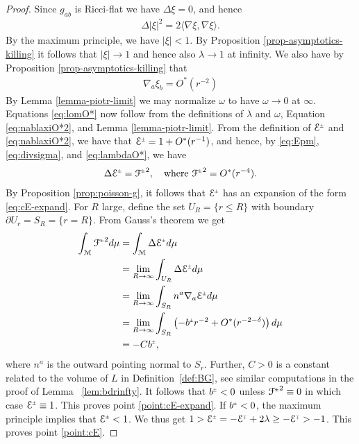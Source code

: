 \documentclass[a4paper,10pt,reqno]{amsart}
\newcommand{\la}{\langle}
\newcommand{\ra}{\rangle}
\newcommand{\cE}{\mathcal{E}}
\newcommand{\cM}{\mathcal{M}}
\theoremstyle{plain}
\newcommand{\PM}[1]{{{#1}^{\hspace{-.5pt}\scaleto{\pm}{3.5pt}}}}
\newcommand{\MP}[1]{{{#1}^{\hspace{-.5pt}\scaleto{\mp}{3.5pt}}}}
\def\Fcal{\mathcal{F}}
\numberwithin{equation}{section}
\begin{document}
\begin{proof} 

Since  $g_{ab}$ is Ricci-flat we have $\Delta \xi = 0$, and hence
\begin{align} 
\Delta |\xi|^2 = 2 \la \nabla\xi, \nabla\xi\ra . 
\end{align} 
By the maximum principle, we have $|\xi| < 1$. By Proposition \ref{prop-asymptotics-killing} it follows that $|\xi| \to 1$ and hence also $\lambda \to 1$ at infinity. 
We also have by Proposition \ref{prop-asymptotics-killing} that \begin{align} \label{eq:nablaxiO*2}
\nabla_a \xi_b = O^*(r^{-2})
\end{align} 
By Lemma \ref{lemma-piotr-limit} we may normalize $\omega$ to have $\omega \rightarrow 0$ at $\infty$. 
Equations \eqref{eq:lomO*} now follow from the definitions of $\lambda$ and $\omega$, Equation \eqref{eq:nablaxiO*2}, and Lemma \ref{lemma-piotr-limit}. 
From the definition of $\PM{\cE}$ and \eqref{eq:nablaxiO*2}, we have that $\PM{\cE} = 1 + O^*(r^{-1})$, and hence, by \eqref{eq:Epm}, \eqref{eq:divsigma}, and \eqref{eq:lambdaO*}, we have 
\begin{align} \label{eq:Duf}
\Delta \PM{\cE} = \PM{\Fcal}^2, \quad \text{where $\PM{\Fcal}^2 = O^*(r^{-4})$.}
\end{align}
By Proposition \ref{prop:poisson-g}, it follows that $\PM{\cE}$ has an expansion of the form \eqref{eq:cE-expand}. For $R$ large, define the set $U_R = \{r \leq R \}$ with boundary 
$\partial U_r = S_R = \{r = R \}$. From Gauss's theorem we get 
\begin{align}
\int_{\cM} \PM{\Fcal}^2 d\mu 
&= \int_{\cM} \Delta \PM{\cE} d\mu \nonumber \\
&= \lim_{R \to \infty} \int_{U_R} \Delta \PM{\cE} d\mu \nonumber \\
&= \lim_{R \to \infty} \int_{S_R} n^a \nabla_{a} \PM{\cE} d\mu \nonumber \\
&= \lim_{R \to \infty} \int_{S_R} \left( - \PM{b} r^{-2} + O^*(r^{-2- \delta})\right) d\mu \nonumber \\
&= - C \PM{b},
\end{align}
where $n^a$ is the outward pointing normal to $S_r$. Further, $C > 0$ is a constant related to the volume of $L$ in Definition~\ref{def:BG}, see similar computations in the proof of Lemma~ \ref{lem:bdrinfty}. It follows that $\PM{b} < 0$ unless 
$\PM{\Fcal}^2 \equiv 0$ in which case $\PM{\cE} \equiv 1$. This proves point \eqref{point:cE-expand}. If $\PM{b} < 0$, the maximum principle implies that $\PM{\cE} < 1$. We thus get $1 > \PM{\cE} = - \MP{\cE} + 2\lambda \geq - \MP{\cE} > -1$. This proves point \eqref{point:cE}.
\end{proof} 
\end{document}
